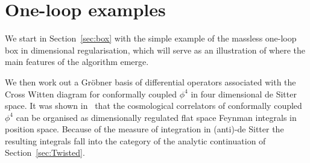 \documentclass[a4paper,12pt]{article}
\numberwithin{equation}{section}
\numberwithin{figure}{section}
\begin{document}
\section{One-loop examples}\label{sec:oneloop}
We start in Section~\ref{sec:box} with the simple example of the
massless  one-loop box in dimensional regularisation, which will serve
as an illustration of where the main features of the algorithm emerge.

We then work out a Gr\"obner basis of differential operators
associated with the Cross Witten diagram for conformally coupled 
$\phi^4$  in  four dimensional  de Sitter space. It was shown
 in~\cite{Heckelbacher:2022fbx,Heckelbacher:2022hbq}  that the
 cosmological correlators of conformally coupled $\phi^4$ can be organised  as dimensionally regulated flat space Feynman integrals in position
space. Because of the measure of integration in (anti)-de Sitter the
resulting integrals fall into the category of the analytic
continuation of Section~\ref{sec:Twisted}. 


\end{document}

